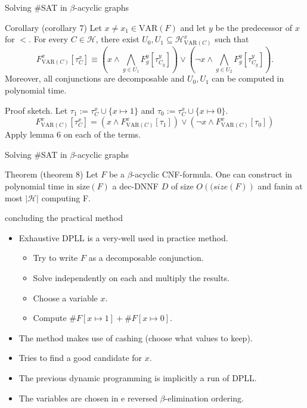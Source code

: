 \begin{frame}[t]{Solving \#SAT in $\beta$-acyclic graphs}
	\begin{block}{Corollary (corollary 7)}
		Let $x \neq x_1 \in \mathrm{VAR}(F)$ and let $y$ be the predecessor of $x$ for $<$. For every $C \in \mathcal{H}$, there exist $U_0, U_1 \subseteq \mathcal{H}^x_{\mathrm{VAR}(C)}$ such that
		$$F^x_{\mathrm{VAR}(C)}[\tau^x_C] \equiv 
		( x \land \bigwedge\limits_{g \in U_1} F^y_g[\tau^y_{C_g}]) \lor
		( \lnot x \land \bigwedge\limits_{g \in U_2} F^y_g[\tau^y_{C_g}]).
		$$
		Moreover, all conjunctions are decomposable and $U_0, U_1$ can be computed in polynomial time.
	\end{block}

	\pause
	Proof sketch. Let $\tau_1 := \tau^x_C \cup \{x \mapsto 1\}$ and $\tau_0 := \tau^x_C \cup \{x \mapsto 0\}$.
	$$F^x_{\mathrm{VAR}(C)}[\tau^x_C] =  (x \land F^x_{\mathrm{VAR}(C)}[\tau_1]) \lor (\lnot x \land F^x_{\mathrm{VAR}(C)}[\tau_0])$$	
		Apply lemma 6 on each of the terms.
\end{frame}

\begin{frame}[t]{Solving \#SAT in $\beta$-acyclic graphs}
	\begin{block}{Theorem (theorem 8)}
		Let $F$ be a $\beta$-acyclic CNF-formula. One can construct in polynomial time in $\mathrm{size}(F)$ a dec-DNNF $D$ of size $O(\mathrm(size(F))$ and fanin at most $|\mathcal{H}|$ computing F.
	\end{block}
\end{frame}

\begin{frame}[t]{concluding the practical method}
	\begin{itemize}[<+->]
		\item Exhaustive DPLL is a very-well used in practice method.
			\begin{itemize}
				\item Try to write $F$ as a decomposable conjunction. 
				\item[] \hspace{1cm}Solve independently on each and multiply the results.
				\item Choose a variable $x$.
				\item[] \hspace{1cm}Compute $\#F[x\mapsto 1] + \#F[x\mapsto 0]$.
			\end{itemize}
		\item The method makes use of cashing (choose what values to keep).
		\item Tries to find a good candidate for $x$.
		\item The previous dynamic programming is implicitly a run of DPLL. 
		\item The variables are chosen in e reversed $\beta$-elimination ordering. 
	\end{itemize}
\end{frame}
